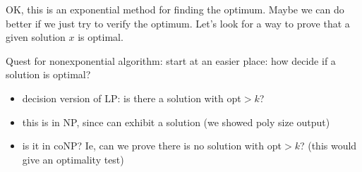 \documentclass{article}
\begin{document}
OK, this is an exponential method for finding the optimum.  Maybe we
can do better if we just try to verify the optimum.  Let's look for a
way to prove that a given solution $x$ is optimal.

Quest for nonexponential algorithm: start at an easier place: how
decide if a solution is optimal?
\begin{itemize}
\item decision version of LP: is there a solution with opt$>k$?
\item this is in NP, since can exhibit a solution (we showed poly size
  output)
\item is it in coNP?  Ie, can we prove there is no solution with
  opt$>k$? (this would give an optimality test)
\end{itemize}
\end{document}
